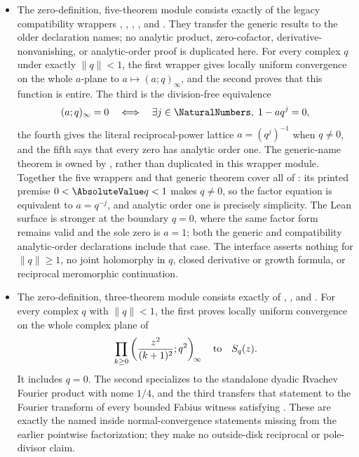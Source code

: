 \documentclass[11pt,a4paper,oneside,openany]{book}
\theoremstyle{definition}
\theoremstyle{remark}
\begin{document}
\begin{itemize}
\item The zero-definition, five-theorem module
 consists exactly of the legacy compatibility
wrappers
,
,
,
, and
.
They transfer the generic  results to the older
 declaration names; no analytic product,
zero-cofactor, derivative-nonvanishing, or analytic-order proof is duplicated
here.  For every complex \(q\) under exactly \(\lVert q\rVert<1\), the first
wrapper gives locally uniform convergence on the whole \(a\)-plane to
\(a\mapsto(a;q)_\infty\), and the second proves that this function is entire.
The third is the division-free equivalence
\[
 (a;q)_\infty=0
 \quad\Longleftrightarrow\quad
 \exists j\in\NaturalNumbers,\;1-aq^j=0,
\]
the fourth gives the literal reciprocal-power lattice \(a=(q^j)^{-1}\) when
\(q\ne0\), and the fifth says that every zero has analytic order one.  The
generic-name theorem
 is owned by
, rather than duplicated in this wrapper
module.  Together the five wrappers and that generic theorem cover all of
: its printed premise
\(0<\AbsoluteValue q<1\) makes \(q\ne0\), so the factor equation is equivalent
to \(a=q^{-j}\), and analytic order one is precisely simplicity.  The Lean
surface is stronger at the boundary \(q=0\), where the same factor form remains
valid and the sole zero is \(a=1\); both the generic and compatibility
analytic-order declarations include that case.  The interface asserts
nothing for
\(\lVert q\rVert\ge1\), no joint holomorphy in \(q\), closed derivative or
growth formula, or reciprocal meromorphic continuation.

\item The zero-definition, three-theorem module
 consists exactly of
,
,
and
.
For every complex \(q\) with \(\lVert q\rVert<1\), the first proves locally
uniform convergence on the whole complex plane of
\[
 \prod_{k\ge0}
 \left(\frac{z^2}{(k+1)^2};q^2\right)_{\!\infty}
 \quad\hbox{to}\quad S_q(z).
\]
It includes \(q=0\).  The second specializes to the standalone dyadic
Rvachev Fourier product with nome \(1/4\), and the third transfers that
statement to the Fourier transform of every bounded Fabius witness satisfying
.  These are exactly the named inside normal-convergence
statements missing from the earlier pointwise factorization; they make no
outside-disk reciprocal or pole-divisor claim.


\end{itemize}
\end{document}
